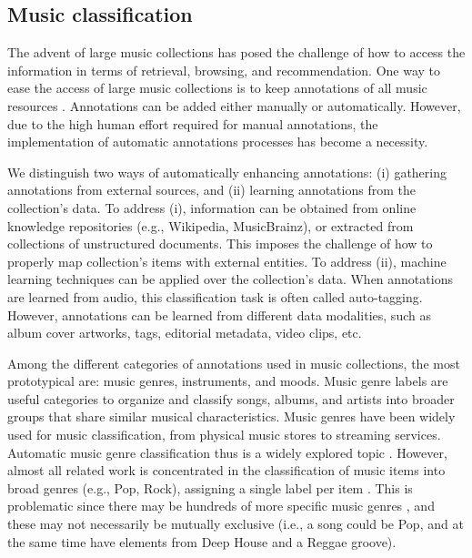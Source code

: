 \subsection{Music classification}
\label{sec:intro:annotation}

The advent of large music collections has posed the challenge of how to access the information in terms of retrieval, browsing, and recommendation. One way to ease the access of large music collections is to keep annotations of all music resources \citep{sordo2012semantic}. Annotations can be added either manually or automatically. 
However, due to the high human effort required for manual annotations, the implementation of automatic annotations processes has become a necessity. 

We distinguish two ways of automatically enhancing annotations: (i) gathering annotations from external sources, and (ii) learning annotations from the collection's data. To address (i), information can be obtained from online knowledge repositories (e.g., Wikipedia, MusicBrainz), or extracted from collections of unstructured documents. This imposes the challenge of how to properly map collection's items with external entities. To address (ii), machine learning techniques can be applied over the collection's data. When annotations are learned from audio, this classification task is often called auto-tagging. However, annotations can be learned from different data modalities, such as album cover artworks, tags, editorial metadata, video clips, etc.

Among the different categories of annotations used in music collections, the most prototypical are: music genres, instruments, and moods. 
Music genre labels are useful categories to organize and classify songs, albums, and artists into broader groups that share similar musical characteristics. Music genres have been widely used for music classification, from physical music stores to streaming services. Automatic music genre classification thus is a widely explored topic \citep{sturm2012survey}.
However, almost all related work is concentrated in the classification of music items into broad genres (e.g., Pop, Rock), assigning a single label per item \citep{bogdanov2016cross}. This is problematic since there may be hundreds of more specific music genres \citep{pachet2000taxonomy}, and these may not necessarily be mutually exclusive (i.e., a song could be Pop, and at the same time have elements from Deep House and a Reggae groove). 

